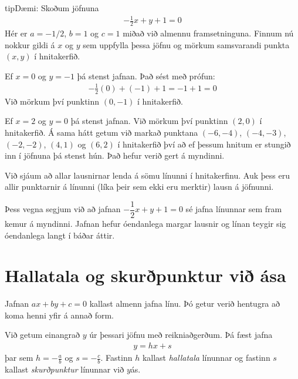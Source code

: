 \documentclass[a4paper,10pt,icelandic]{sphinxmanual}
\begin{document}
\begin{sphinxadmonition}{tip}{Dæmi:}
Skoðum jöfnuna
\begin{equation*}
\begin{split}-\frac12 x +y +1=0\end{split}
\end{equation*}
Hér er \(a=-1/2\), \(b=1\) og \(c=1\) miðað við almennu framsetninguna.
Finnum nú nokkur gildi á \(x\) og \(y\) sem uppfylla þessa jöfnu og mörkum samsvarandi punkta \((x,y)\) í hnitakerfið.

Ef \(x=0\) og \(y=-1\) þá stenst jafnan. Það sést með prófun:
\begin{equation*}
\begin{split}-\frac{1}{2} (0) +(-1) +1= -1+1 = 0\end{split}
\end{equation*}
Við mörkum því punktinn \((0,-1)\) í hnitakerfið.

Ef \(x=2\) og \(y=0\) þá stenst jafnan. Við mörkum því punktinn \((2,0)\) í hnitakerfið.
Á sama hátt getum við markað punktana \((-6,-4)\), \((-4,-3)\), \((-2,-2)\), \((4,1)\) og \((6,2)\) í hnitakerfið því að ef þessum hnitum er stungið inn í jöfnuna þá stenst hún.
Það hefur verið gert á myndinni.


Við sjáum að allar lausnirnar lenda á sömu línunni í hnitakerfinu. Auk þess eru allir punktarnir á línunni (líka þeir sem ekki eru merktir) lausn á jöfnunni.

Þess vegna segjum við að jafnan \(-\dfrac{1}{2}x+y+1=0\) sé jafna línunnar sem fram kemur á myndinni. Jafnan hefur óendanlega margar lausnir og línan teygir sig óendanlega langt í báðar áttir.
\end{sphinxadmonition}


\section{Hallatala og skurðpunktur við ása}
\label{\detokenize{Kafli03:hallatala-og-skurpunktur-vi-asa}}
Jafnan \(ax+by+c=0\) kallast almenn jafna línu. Þó getur verið hentugra að koma henni yfir á annað form.

Við getum einangrað \(y\) úr þessari jöfnu með reikniaðgerðum. Þá fæst jafna
\begin{equation*}
\begin{split}y=hx+s\end{split}
\end{equation*}
þar sem \(h = -\frac{a}{b}\) og \(s = -\frac{c}{b}\).
Fastinn \(h\) kallast \textit{hallatala} línunnar og fastinn \(s\) kallast \textit{skurðpunktur} línunnar við \(y\)\sphinxhyphen{}ás.
\end{document}
